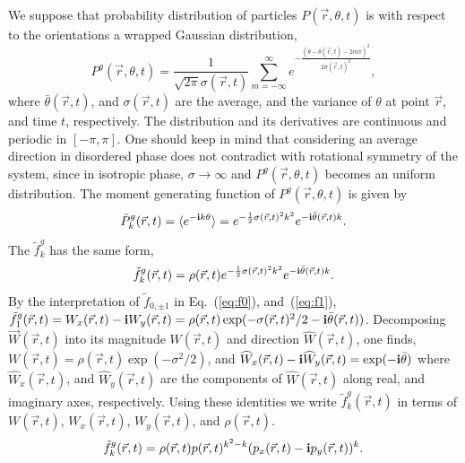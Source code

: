 \documentclass[reprint,floatfix,amsmath,amssymb,aps,pre,showkeys,showpacs,superscriptaddress]{revtex4-1}
\newcommand{\ave}[1]{\langle #1 \rangle}
\newcommand{\p}{p}
\newcommand{\im}{{\rm \bf i}}
\newcommand{\w}{W}
\newcommand{\vw}{\vec{\w}}
\newcommand{\hl}[1]{\textcolor{hlcolor}{#1}}
\newcommand{\reqs}[2]{Eq.~(\ref{#1}), and~(\ref{#2})}
\begin{document}
We suppose that \hl{probability} distribution of particles $P(\vec{r},\theta,t)$ is \hl{with respect to the orientations} a wrapped Gaussian distribution,
\begin{equation}
P^{g}(\vec{r},\theta,t) = \frac{1}{\sqrt{2 \pi} \sigma(\vec{r},t)} \sum_{m=-\infty}^{\infty} e^{-\frac{(\theta-\bar{\theta}(\vec{r},t) - 2 m \pi)^2}{2\sigma(\vec{r},t)^2}},
\label{eq:Wrapped-Gaussian}
\end{equation}
where $\bar{\theta}(\vec{r},t)$, and $\sigma(\vec{r},t)$ are the average, and the variance of $\theta$ at point $\vec{r}$, and time $t$, respectively. \hl{The distribution and its derivatives are continuous and periodic in $[-\pi,\pi]$}. One should keep in mind that considering an average direction in disordered phase does not contradict with rotational symmetry of the system, since in isotropic phase, $\sigma \to \infty$ and $P^g(\vec{r},\theta,t)$ becomes an uniform distribution. The moment generating function of $P^g(\vec{r},\theta,t)$ is given by
\begin{equation}
\tilde{P}^g_k(\vec{r},t) = \ave{e^{-\im k \theta}} = e^{-\frac{1}{2} \sigma(\vec{r},t)^2 k^2 } e^{-\im \bar{\theta}(\vec{r},t) k}.
\label{eq:moment-generator-Pk}
\end{equation}
The $\tilde{f}^g_k$ has the same form,
\begin{equation}
\tilde{f}^g_k(\vec{r},t) = \rho(\vec{r},t) e^{-\frac{1}{2} \sigma(\vec{r},t)^2 k^2 } e^{-\im \bar{\theta}(\vec{r},t) k}.
\end{equation}
By the interpretation of $\tilde{f}_{0,\pm 1}$ in \reqs{eq:f0}{eq:f1}, \hl{$\tilde{f}^g_1(\vec{r},t) = \w_x(\vec{r},t) - \im \w_y(\vec{r},t) = \rho(\vec{r},t) \exp(-\sigma(\vec{r},t)^2/2 - \im \bar{\theta}(\vec{r},t))$}. Decomposing \hl{$\vw(\vec{r},t)$} into its magnitude \hl{$\w(\vec{r},t)$} and direction \hl{$\widehat{\w}(\vec{r},t)$}, one finds, \hl{$\w(\vec{r},t) = \rho(\vec{r},t) \exp(-\sigma^2/2)$}, and \hl{$\widehat{\w}_x(\vec{r},t) - \im \widehat{\w}_y(\vec{r},t) = \exp(-\im \bar{\theta})$} where \hl{$\widehat{\w}_x(\vec{r},t)$}, and \hl{$\widehat{\w}_y(\vec{r},t)$} are the components of \hl{$\widehat{\w}(\vec{r},t)$} along \hl{real, and imaginary axes,} respectively. Using these identities we write $\tilde{f}^g_k(\vec{r},t)$ in terms of \hl{$\w(\vec{r},t)$, $\w_x(\vec{r},t)$, $\w_y(\vec{r},t)$}, and $\rho(\vec{r},t)$.
\begin{equation}
\tilde{f}^g_k(\vec{r},t) = \rho(\vec{r},t) \p(\vec{r},t)^{k^2 - k} (\p_x(\vec{r},t) - \im \p_y(\vec{r},t))^k.
\label{eq:Gaussian-fk}
\end{equation}
\end{document}
